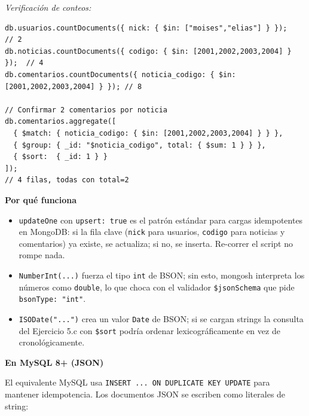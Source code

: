 \documentclass[11pt,a4paper]{article}
\newcommand{\itemcabecera}[1]{\noindent\textbf{#1}\par\medskip}
\newcommand{\bloquePorque}{\itemcabecera{Por qu\'e funciona}}
\newcommand{\bloqueMySQL}{\itemcabecera{En MySQL 8+ (JSON)}}
\begin{document}
\textit{Verificación de conteos:}

\begin{lstlisting}
db.usuarios.countDocuments({ nick: { $in: ["moises","elias"] } });       // 2
db.noticias.countDocuments({ codigo: { $in: [2001,2002,2003,2004] } });  // 4
db.comentarios.countDocuments({ noticia_codigo: { $in: [2001,2002,2003,2004] } }); // 8

// Confirmar 2 comentarios por noticia
db.comentarios.aggregate([
  { $match: { noticia_codigo: { $in: [2001,2002,2003,2004] } } },
  { $group: { _id: "$noticia_codigo", total: { $sum: 1 } } },
  { $sort:  { _id: 1 } }
]);
// 4 filas, todas con total=2
\end{lstlisting}

\bloquePorque

\begin{itemize}
    \item \texttt{updateOne} con \texttt{upsert: true} es el patrón estándar para cargas idempotentes en MongoDB: si la fila clave (\texttt{nick} para usuarios, \texttt{codigo} para noticias y comentarios) ya existe, se actualiza; si no, se inserta. Re-correr el script no rompe nada.
    \item \texttt{NumberInt(...)} fuerza el tipo \texttt{int} de BSON; sin esto, mongosh interpreta los números como \texttt{double}, lo que choca con el validador \texttt{\$jsonSchema} que pide \texttt{bsonType: "int"}.
    \item \texttt{ISODate("...")} crea un valor \texttt{Date} de BSON; si se cargan strings la consulta del Ejercicio 5.c con \texttt{\$sort} podría ordenar lexicográficamente en vez de cronológicamente.
\end{itemize}

\bloqueMySQL

El equivalente MySQL usa \texttt{INSERT ... ON DUPLICATE KEY UPDATE} para mantener idempotencia. Los documentos JSON se escriben como literales de string:
\end{document}
